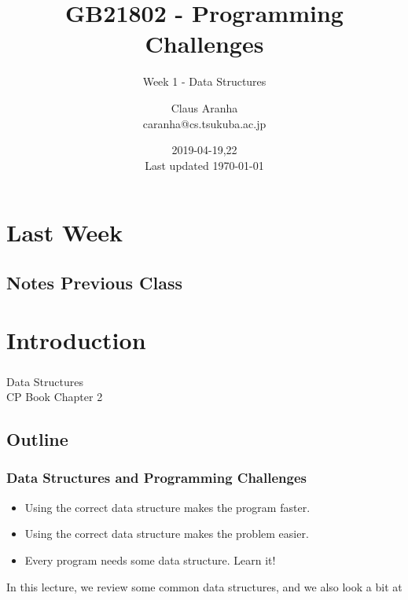 \documentclass{beamer}
\title[GB21802]{GB21802 - Programming Challenges}
\subtitle[]{Week 1 - Data Structures}
\author[Claus Aranha]{Claus Aranha\\{\footnotesize caranha@cs.tsukuba.ac.jp}}
\institute{College of Information Science}
\date{2019-04-19,22\\{\tiny Last updated \today}}
\begin{document}
\begin{frame}
\maketitle
\end{frame}

\section{Last Week}
\subsection{Notes Previous Class}



\section{Introduction}
\begin{frame}
  \frametitle{}

  \begin{center}
    {\large Data Structures}\\
    CP Book Chapter 2
  \end{center}
\end{frame}

\subsection{Outline}
\begin{frame}
  \frametitle{Data Structures and Programming Challenges}

  \begin{itemize}
    \item Using the correct data structure makes the \alert{program faster}.
    \bigskip

    \item Using the correct data structure makes the \alert{problem easier}.
    \bigskip

    \item Every program needs \alert{some} data structure. Learn it!
  \end{itemize}

  \vfill

  \begin{block}{}
    In this lecture, we review some common data structures, and we
    also look a bit at 
  \end{block}
\end{frame}
\end{document}
